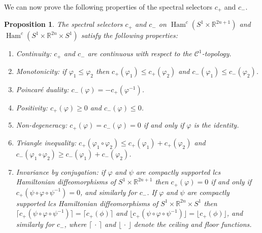 \documentclass{amsart}
\DeclareMathOperator{\Ham}{Ham}
\newtheorem{prop}[thm]{Proposition}
\theoremstyle{remark}
\begin{document}
We can now prove the following properties
of the spectral selectors $c_+$ and $c_-$.

\begin{prop}\label{proposition: properties of spectral invariants}
The spectral selectors $c_+$ and $c_-$
on $\Ham^c (S^1 \times \mathbb{R}^{2n+1})$
and $\Ham^c (S^1 \times \mathbb{R}^{2n} \times S^1)$
satisfy the following properties:
\renewcommand{\theenumi}{\roman{enumi}}
\begin{enumerate}
\item \label{properties spectral sel diffeomorphisms: continuity} \emph{Continuity:}
$c_+$ and $c_-$ are continuous with respect to the $\mathcal{C}^1$-topology.
\item \label{properties spectral sel diffeomorphisms: monotonicity} \emph{Monotonicity:}
if $\varphi_1 \leq \varphi_2$ then $c_+ (\varphi_1) \leq c_+ (\varphi_2)$
and $c_- (\varphi_1) \leq c_- (\varphi_2)$.
\item \label{properties spectral sel diffeomorphisms: PD} \emph{Poincar\'e duality:}
$c_- (\varphi) = - c_+ (\varphi ^{-1})$.
\item \label{properties spectral sel diffeomorphisms: positivity} \emph{Positivity:}
$c_+ (\varphi) \geq 0$ and $c_- (\varphi) \leq 0$.
\item \label{properties spectral sel diffeomorphisms: non-degeneracy} \emph{Non-degeneracy:}
$c_+ (\varphi) = c_- (\varphi) = 0$ if and only if $\varphi$ is the identity.
\item \label{properties spectral sel diffeomorphisms: triangle inequality} \emph{Triangle inequality:}
$c_+ (\varphi_1 \circ \varphi_2) \leq c_+ (\varphi_1) + c_+ (\varphi_2)$
and $c_- (\varphi_1 \circ \varphi_2) \geq c_- (\varphi_1) + c_- (\varphi_2)$.
\item \label{properties spectral sel diffeomorphisms: invariance by conjugation}
\emph{Invariance by conjugation:}
if $\varphi$ and $\psi$ are compactly supported
lcs Hamiltonian diffeomorphisms of $S^1 \times \mathbb{R}^{2n+1}$
then $c_+ (\varphi) = 0$ if and only if $c_+ (\psi \circ \varphi \circ \psi^{-1}) = 0$,
and similarly for $c_-$.
If $\varphi$ and $\psi$ are compactly supported lcs Hamiltonian diffeomorphisms
of $S^1 \times \mathbb{R}^{2n} \times S^1$
then $\lceil c_+ (\psi \circ \varphi \circ \psi^{-1})\rceil
= \lceil c_+ (\phi) \rceil$
and $\lfloor c_+ (\psi \circ \varphi \circ \psi^{-1}) \rfloor
= \lfloor c_+ (\phi) \rfloor$,
and similarly for $c_-$,
where $\lceil \,\cdot\, \rceil$ and $\lfloor \,\cdot\, \rfloor$
denote the ceiling and floor functions.
\end{enumerate}
\end{prop}
\end{document}

